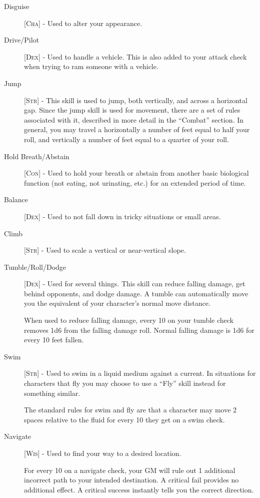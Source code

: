 \begin{description}
\item[Disguise] [\textsc{Cha}] - Used to alter your appearance.

\item[Drive/Pilot] [\textsc{Dex}] - Used to handle a vehicle. This is also added to your attack check when trying to ram someone with a vehicle.

\item[Jump] [\textsc{Str}] - This skill is used to jump, both vertically, and across a horizontal gap. Since the jump skill is used for movement, there are a set of rules associated with it, described in more detail in the “Combat” section. In general, you may travel a horizontally a number of feet equal to half your roll, and vertically a number of feet equal to a quarter of your roll.

\item[Hold Breath/Abstain] [\textsc{Con}] - Used to hold your breath or abstain from another basic biological function (not eating, not urinating, etc.) for an extended period of time.

\item[Balance] [\textsc{Dex}] - Used to not fall down in tricky situations or small areas.

\item[Climb] [\textsc{Str}] - Used to scale a vertical or near-vertical slope.

\item[Tumble/Roll/Dodge] [\textsc{Dex}] - Used for several things. This skill can reduce falling damage, get behind opponents, and dodge damage. A tumble can automatically move you the equivalent of your character’s normal move distance.

When used to reduce falling damage, every 10 on your tumble check removes 1d6 from the falling damage roll. Normal falling damage is 1d6 for every 10 feet fallen.

\item[Swim] [\textsc{Str}] - Used to swim in a liquid medium against a current. In situations for characters that fly you may choose to use a ``Fly'' skill instead for something similar. 

The standard rules for swim and fly are that a character may move 2 spaces relative to the fluid for every 10 they get on a swim check.

\item[Navigate] [\textsc{Wis}] - Used to find your way to a desired location.

For every 10 on a navigate check, your GM will rule out 1 additional incorrect path to your intended destination. A critical fail provides no additional effect. A critical success instantly tells you the correct direction.


\end{description}
